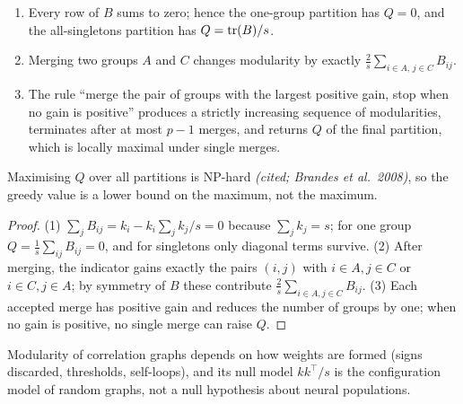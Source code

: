 \begin{theorem}\label{ars:graph-001}
\begin{enumerate}[leftmargin=2em]
\item Every row of $B$ sums to zero; hence the one-group partition has $Q=0$, and the all-singletons partition has $Q=\operatorname{tr}(B)/s$.
\item Merging two groups $A$ and $C$ changes modularity by exactly $\frac2s\sum_{i\in A,\,j\in C}B_{ij}$.
\item The rule ``merge the pair of groups with the largest positive gain, stop when no gain is positive'' produces a strictly increasing sequence of modularities, terminates after at most $p-1$ merges, and returns $Q$ of the final partition, which is locally maximal under single merges.
\end{enumerate}
Maximising $Q$ over all partitions is NP-hard \emph{(cited; Brandes et al.\ 2008)}, so the greedy value is a lower bound on the maximum, not the maximum.
\end{theorem}
\begin{proof}
(1) $\sum_jB_{ij}=k_i-k_i\sum_jk_j/s=0$ because $\sum_jk_j=s$; for one group $Q=\frac1s\sum_{ij}B_{ij}=0$, and for singletons only diagonal terms survive. (2) After merging, the indicator gains exactly the pairs $(i,j)$ with $i\in A,j\in C$ or $i\in C,j\in A$; by symmetry of $B$ these contribute $\frac2s\sum_{i\in A,j\in C}B_{ij}$. (3) Each accepted merge has positive gain and reduces the number of groups by one; when no gain is positive, no single merge can raise $Q$.
\end{proof}
Modularity of correlation graphs depends on how weights are formed (signs discarded, thresholds, self-loops), and its null model $kk^\top/s$ is the configuration model of random graphs, not a null hypothesis about neural populations.

